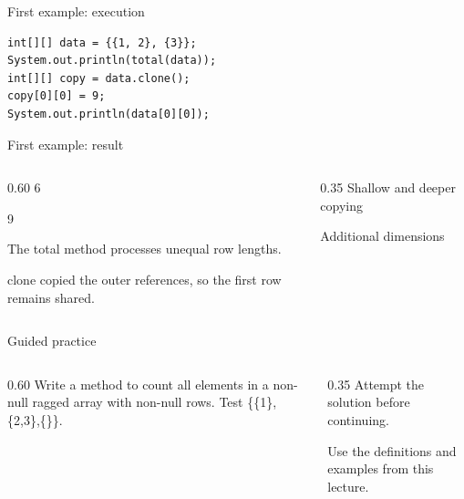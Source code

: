 \documentclass[10pt,aspectratio=169]{beamer}
\begin{document}
\begin{frame}[fragile,t]{First example: execution}
\begin{lstlisting}
int[][] data = {{1, 2}, {3}};
System.out.println(total(data));
int[][] copy = data.clone();
copy[0][0] = 9;
System.out.println(data[0][0]);
\end{lstlisting}
\end{frame}

\begin{frame}[fragile,t]{First example: result}
\begin{columns}[T,onlytextwidth]\begin{column}{0.60\textwidth}
6\par 9\par The total method processes unequal row lengths.\par clone copied the outer references, so the first row remains shared.
\end{column}\begin{column}{0.35\textwidth}\small
Shallow and deeper copying

Additional dimensions
\end{column}\end{columns}
\end{frame}

\begin{frame}[fragile,t]{Guided practice}
\begin{columns}[T,onlytextwidth]\begin{column}{0.60\textwidth}
Write a method to count all elements in a non-null ragged array with non-null rows. Test \{\{1\},\{2,3\},\{\}\}.
\end{column}\begin{column}{0.35\textwidth}\small
Attempt the solution before continuing.

Use the definitions and examples from this lecture.
\end{column}\end{columns}
\end{frame}
\end{document}
